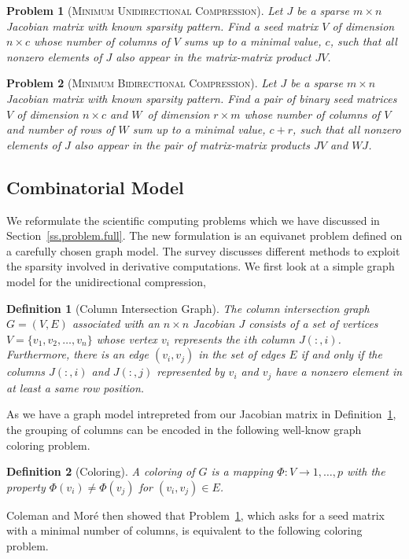 \documentclass[12pt, oneside]{book}
\newtheorem{problem}{Problem}
\newtheorem{definition}{Definition}
\newcommand{\secref}[1]{Section~\protect\ref{#1}}
\newcommand{\defref}[1]{Definition~\protect\ref{#1}}
\newcommand{\col}{\ensuremath{c}}
\newcommand{\row}{\ensuremath{r}}
\newcommand{\MinUniCom}{\textsc{Minimum Unidirectional Compression}}
\newcommand{\MinBidCom}{\textsc{Minimum Bidirectional Compression}}
\begin{document}
\begin{problem}[\MinUniCom]
\label{p.seed.uni} Let $J$ be a sparse ${m\times n}$ Jacobian matrix with known sparsity
pattern. Find a seed matrix $V$ of dimension $n\times \col$ 
whose number of columns of $V$ sums up
to a minimal value, $\col$, such that all nonzero elements of $J$ also appear in
the matrix-matrix product $JV$.
\end{problem}

\begin{problem}[\MinBidCom]
\label{p.seed.bid} Let $J$ be a sparse ${m\times n}$ Jacobian matrix with known sparsity
pattern. Find a pair of binary seed matrices $V$ of dimension $n\times \col$ and $W$~of
dimension $\row \times m$ whose number of columns of $V$ and number of rows of $W$ sum up
to a minimal value, $\col + \row$, such that all nonzero elements of $J$ also appear in
the pair of matrix-matrix products $JV$ and $WJ$.
\end{problem}

\subsection{Combinatorial Model}
\label{s.modeling}
We reformulate the scientific computing problems which 
we have discussed in \secref{ss.problem.full}. 
The new formulation is an equivanet problem defined on a
carefully chosen graph model. The survey \cite{Gebremedhin05whatcolor} 
discusses different methods
to exploit the sparsity involved in derivative computations.
We first look at a simple graph model for the unidirectional compression,
%
\begin{definition}[Column Intersection Graph]
\label{d:cig}
The column intersection graph $G = (V,E)$ associated with an $n \times n$ Jacobian $J$
consists of a set of vertices $V=\{v_1, v_2, \dots, v_n\}$ whose vertex $v_i$ represents
the $i$th column $J(:,i)$. Furthermore, there is an edge $(v_i,v_j)$ in the set of edges
$E$ if and only if the columns $J(:,i)$ and $J(:,j)$ represented by $v_i$ and $v_j$ have
a nonzero element in at least a same row position.
\end{definition}

As we have a graph model intrepreted from our Jacobian matrix in \defref{d:cig},
the grouping of columns can be encoded in the following well-know graph coloring problem.
%
\begin{definition}[Coloring]
A coloring of $G$ is a mapping $\Phi : V \to {1, \dots, p}$ with the property
$\Phi(v_i)\neq \Phi(v_j)$ for $(v_i,v_j) \in E$.
\end{definition}
%
Coleman and Mor\'{e} \cite{Coleman1983EoS} then showed that Problem~\ref{p.seed.uni}, which
asks for a seed matrix with a minimal number of columns, is equivalent to the following
coloring problem.
\end{document}
